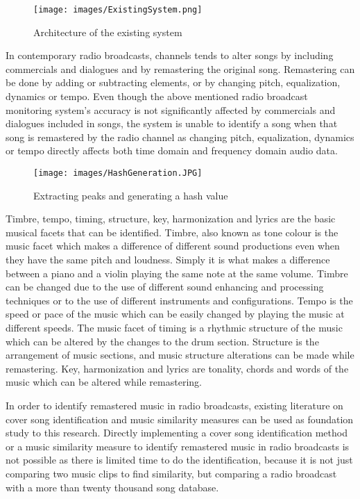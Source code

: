 \vspace{12pt}

\begin{figure}[h]
    \centering
    \texttt{[image: images/ExistingSystem.png]}
    \caption{Architecture of the existing system}
    \label{fig:existing_system}
\end{figure}
\vspace{12pt}

In contemporary radio broadcasts, channels tends to alter songs by including commercials and dialogues and by remastering 
the original song. Remastering can be done by adding or subtracting elements, or by changing pitch, equalization, dynamics or 
tempo\cite{Serra2010}. Even though the above mentioned radio broadcast monitoring system's accuracy is not significantly 
affected by commercials and dialogues included in songs, the system is unable to identify a song when that song is remastered 
by the radio channel as changing pitch, equalization, dynamics or tempo directly affects both time domain and 
frequency domain audio data.

\vspace{12pt}

\begin{figure}[h]
    \centering
    \texttt{[image: images/HashGeneration.JPG]}
    \caption{Extracting peaks and generating a hash value\cite{E.D.N.W.Senevirathna2018}}
    \label{fig:fingerprint}
\end{figure}

\vspace{12pt}

Timbre, tempo, timing, structure, key, harmonization and lyrics are the basic musical facets that can be 
identified\cite{Serra2010}. Timbre, also known as tone colour is the music facet which makes a difference of different 
sound productions even when they have the same pitch and loudness. Simply it is what makes a difference between a piano 
and a violin playing the same note at the same volume. Timbre can be changed due to the use of different sound enhancing 
and processing techniques or to the use of different instruments and configurations. Tempo is the speed or pace of the 
music which can be easily changed by playing the music at different speeds. The music facet of timing is a rhythmic structure 
of the music which can be altered by the changes to the drum section. Structure is the arrangement of music sections, and
music structure alterations can be made while remastering. Key, harmonization and lyrics are 
tonality, chords and words of the music which can be altered while remastering.
\vspace{12pt}

In order to identify remastered music in radio broadcasts,
existing literature on cover song identification and music similarity measures can be used as foundation study to this 
research. Directly implementing a cover song identification method or a music similarity measure to identify remastered 
music in radio broadcasts is not possible as there is limited time to do the identification, because it is not just 
comparing two music clips to find similarity, but comparing a radio broadcast with a more than twenty thousand song database.

